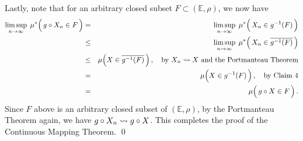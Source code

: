 \vskip 0.5cm
\noindent
Lastly, note that for an arbitrary closed subset $F \subset (\mathbb{E},\rho)$, we now have
\begin{eqnarray*}
\underset{n\rightarrow\infty}{\limsup}\;\, \mu^{*}\!\left(\,g \circ X_{n} \overset{{\color{white}.}}{\in} F\,\right)
&=&
	\underset{n\rightarrow\infty}{\limsup}\;\, \mu^{*}\!\left(\,X_{n} \overset{{\color{white}.}}{\in} g^{-1}(F)\,\right)
\\
&\leq&
	\underset{n\rightarrow\infty}{\limsup}\;\, \mu^{*}\!\left(\,X_{n} \overset{{\color{white}.}}{\in} \overline{g^{-1}(F)}\,\right)
\\
&\leq&
	\mu\!\left(X\overset{{\color{white}.}}{\in}\overline{g^{-1}(F)}\,\right),
	\quad\textnormal{by $X_{n} \wconverge X$ and the Portmanteau Theorem}
\\
&=&
	\mu\!\left(X\overset{{\color{white}.}}{\in}g^{-1}(F)\,\right),
	\quad\textnormal{by Claim 4}
\\
&=&
	\mu\!\left(\,g \circ X\overset{{\color{white}.}}{\in}F\,\right).
\end{eqnarray*}
Since $F$ above is an arbitrary closed subset of $(\mathbb{E},\rho)$,
by the Portmanteau Theorem again, we have \;$g \circ X_{n} \rightsquigarrow g \circ X$.
This completes the proof of the Continuous Mapping Theorem.
\qed



\renewcommand{\theenumi}{\roman{enumi}}
\renewcommand{\labelenumi}{\textnormal{(\theenumi)}$\;\;$}

